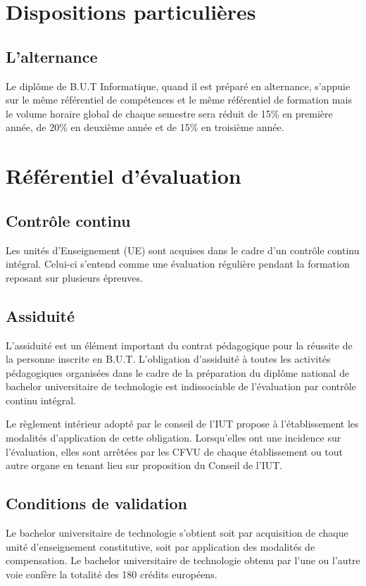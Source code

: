 \documentclass[10pt]{article}
\begin{document}
\section{Dispositions particulières}
\subsection{L'alternance}
Le diplôme de B.U.T Informatique, quand il est préparé en alternance,
s’appuie sur le même référentiel de compétences et le même
référentiel de formation mais le volume horaire global de chaque
semestre sera réduit de 15\% en première année, de 20\% en
deuxième année et de 15\% en troisième année.

\section[Référentiel d'évaluation]{Référentiel d'évaluation}

\subsection{Contrôle continu}
Les unités d'Enseignement (UE) sont acquises dans le cadre d'un contrôle continu intégral. Celui-ci
s'entend comme une évaluation régulière pendant la formation reposant sur plusieurs épreuves.

\subsection{Assiduité}
L'assiduité est un élément important du contrat pédagogique pour la
réussite de la personne inscrite en B.U.T. L'obligation d'assiduité à
toutes les activités pédagogiques organisées dans le cadre de la
préparation du diplôme national de bachelor universitaire de technologie
est indissociable de l'évaluation par contrôle continu intégral.

Le règlement intérieur adopté par le conseil de l'IUT propose à
l'établissement les modalités d'application de cette
obligation. Lorsqu'elles ont une incidence sur l'évaluation, elles sont
arrêtées par les CFVU de chaque établissement ou tout autre organe en
tenant lieu sur proposition du Conseil de l'IUT.

\subsection{Conditions de validation}
Le bachelor universitaire de technologie s'obtient soit par acquisition
de chaque unité d'enseignement constitutive, soit par application des
modalités de compensation. Le bachelor universitaire de technologie
obtenu par l'une ou l'autre voie confère la totalité des 180 crédits
européens.
\end{document}
